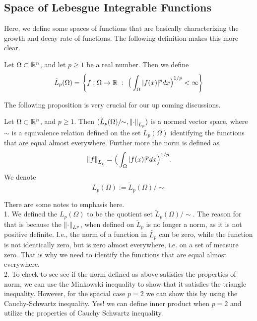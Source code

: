 \subsection{Space of Lebesgue Integrable Functions}
Here, we define some spaces of functions that are basically characterizing the growth and decay rate of functions. The following definition makes this more clear. 
\begin{definition}
	Let $ \Omega \subset \mathbb{R}^n $, and let $ p\geq 1 $ be a real number. Then we define
	\[ \tilde{L}_p(\Omega) = \Set{f:\Omega\to\R\ :\ \big(\int_\Omega \abs{f(x)}^p dx \big)^{1/p} < \infty} \]
\end{definition}

The following proposition is very crucial for our up coming discussions.
\begin{proposition}
	Let $ \Omega \subset \mathbb{R}^n $, and $ p\geq 1 $. Then $ (\tilde{L}_p(\Omega)/\!\!\sim, \norm{\cdot}_{L_p}) $ is a normed vector space, where $ \sim $ is a equivalence relation defined on the set $ L_p(\Omega) $ identifying the functions that are equal almost everywhere. Further more the norm is defined as
	\[ \norm{f}_{L_p} = \big(\int_\Omega |f(x)|^p dx\big)^{1/p}.\]
	We denote 
	\[  L_p(\Omega) :=  \tilde{L}_p(\Omega)/\!\!\sim \]
\end{proposition}
\begin{remark}
	There are some notes to emphasis here. \\
	1. We defined the $ L_p(\Omega) $ to be the quotient set $ \tilde{L}_p(\Omega)/\!\!\sim  $. The reason for that is because the $ \norm{\cdot}_{L^p} $, when defined on $\tilde{L}_p$ is no longer a norm, as it is not positive definite. I.e., the norm of a function in $ \tilde{L_p} $ can be zero, while the function is not identically zero, but is zero almost everywhere, i.e. on a set of measure zero. That is why we need to identify the functions that are equal almost everywhere. \\
	2. To check to see see if the norm defined as above satisfies the properties of norm, we can use the Minkowski inequality to show that it satisfies the triangle inequality. However, for the spacial case $ p=2 $ we can show this by using the Cauchy-Schwartz inequality. Yes! we can define inner product when $ p=2 $ and utilize the properties of Cauchy Schwartz inequality.
\end{remark}